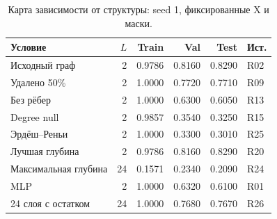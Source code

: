 \begin{table}[H]\centering\footnotesize
\setlength{\tabcolsep}{4pt}
\caption{Карта зависимости от структуры: seed 1, фиксированные X и маски.}\label{tab:map}
\begin{tabular}{lrrrrl}
\toprule
Условие & $L$ & Train & Val & Test & Ист. \\
\midrule
Исходный граф & 2 & 0.9786 & 0.8160 & 0.8290 & R02 \\
Удалено 50\% & 2 & 1.0000 & 0.7720 & 0.7710 & R09 \\
Без рёбер & 2 & 1.0000 & 0.6300 & 0.6050 & R13 \\
Degree null & 2 & 0.9857 & 0.3540 & 0.3250 & R15 \\
Эрдёш--Реньи & 2 & 1.0000 & 0.3300 & 0.3010 & R25 \\
Лучшая глубина & 2 & 0.9786 & 0.8160 & 0.8290 & R20 \\
Максимальная глубина & 24 & 0.1571 & 0.2340 & 0.2090 & R24 \\
MLP & 2 & 1.0000 & 0.6320 & 0.6100 & R01 \\
24 слоя с остатком & 24 & 1.0000 & 0.7680 & 0.7670 & R26 \\
\bottomrule
\end{tabular}
\end{table}

